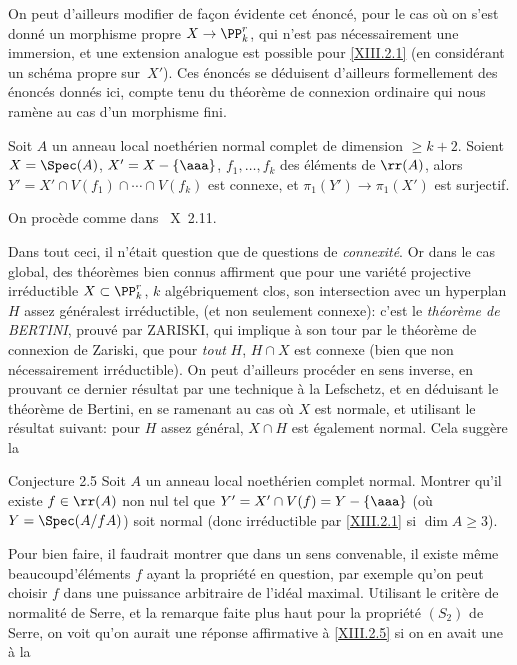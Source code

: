 On peut d'ailleurs modifier de fa\c con
\'evidente cet \'enonc\'e, pour le cas o\`u on s'est donn\'e un morphisme
propre $X \to \PP^r_k$, qui n'est pas n\'ecessairement une
immersion, et une extension analogue est possible pour
\ref{XIII.2.1} (en consid\'erant un sch\'ema propre sur~$X'$). Ces
\'enonc\'es se d\'eduisent d'ailleurs formellement des \'enonc\'es donn\'es
ici, compte tenu du th\'eor\`eme de connexion ordinaire qui nous
ram\`ene au cas d'un morphisme fini.

\begin{corollaire} \label{XIII.2.4}
Soit $A$ un anneau local noeth\'erien normal complet de dimension $\ge k+2$. Soient $X=\Spec (A)$, $X'=X-\{ \aaa\}$, $f_1, \dotsc, f_k$ des \'el\'ements de $\rr(A)$, alors $Y'=X'\cap V(f_1) \cap \dotsb \cap V(f_k)$ est connexe, et $\pi_1(Y')\to \pi_1(X')$ est surjectif.
\end{corollaire}

On proc\`ede comme dans ~X~2.11.

Dans tout ceci, il n'\'etait question que de questions de \emph{connexité}. Or dans le cas global, des th\'eor\`emes bien connus affirment que pour une vari\'et\'e projective irr\'eductible $X\subset \PP^r_k$, $k$ alg\'ebriquement clos, son intersection avec un hyperplan $H$ assez \og g\'en\'eral\fg est irr\'eductible, (et non seulement connexe): c'est le \emph{théorème de BERTINI}, prouv\'e par ZARISKI, qui implique \`a son tour par le th\'eor\`eme de connexion de Zariski, que pour \emph{tout} $H$, $H\cap X$ est connexe (bien que non n\'ecessairement irr\'eductible). On peut d'ailleurs proc\'eder en sens inverse, en prouvant ce dernier r\'esultat par une technique \`a la Lefschetz, et en d\'eduisant le th\'eor\`eme de Bertini, en se ramenant au cas o\`u $X$ est normale, et utilisant le r\'esultat suivant: pour $H$ \og assez g\'en\'eral\fg, $X\cap H$ est \'egalement normal. Cela sugg\`ere la

\label{XIII.2.5}
\begin{enonce*}{Conjecture 2.5\ndemark}
Soit $A$ un anneau local noeth\'erien complet normal. Montrer qu'il existe $f\in\rr(A)$ non nul tel que $Y'=X'\cap V(f)=Y-\{ \aaa\}$ (o\`u $Y=\Spec (A/fA)$) soit normal (donc irr\'eductible par \ref{XIII.2.1} si $\dim A\ge 3$).
\end{enonce*}

Pour bien faire, il faudrait montrer que dans un sens convenable, il existe m\^eme \og beaucoup\fg d'\'el\'ements $f$ ayant la propri\'et\'e en question, par exemple qu'on peut choisir $f$ dans une puissance arbitraire de l'id\'eal maximal. Utilisant le crit\`ere de normalit\'e de Serre, et la remarque faite plus haut pour la propri\'et\'e $(S_2)$ de Serre, on voit qu'on aurait une r\'eponse affirmative \`a \ref{XIII.2.5} si on en avait une \`a la

